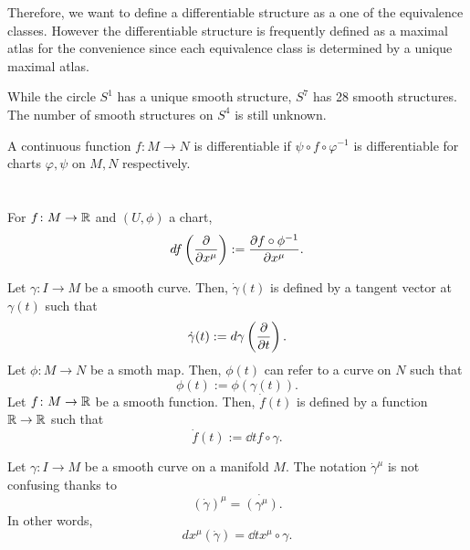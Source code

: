 \documentclass{../crs}
\begin{document}
Therefore, we want to define a differentiable structure as a one of the equivalence classes.
However the differentiable structure is frequently defined as a maximal atlas for the convenience since each equivalence class is determined by a unique maximal atlas.


\begin{ex}
While the circle $S^1$ has a unique smooth structure, $S^7$ has 28 smooth structures.
The number of smooth structures on $S^4$ is still unknown.
\end{ex}

\begin{defn}
A continuous function $f\colon M\to N$ is differentiable if $\psi\circ f\circ\varphi^{-1}$ is differentiable for charts $\varphi,\psi$ on $M,N$ respectively.
\end{defn}




\begin{defn}
\end{defn}





\section{}

\begin{defn}
For $f\colon M\to\R$ and $(U,\phi)$ a chart,
\[df\left(\pd{x^\mu}\right):=\pd{f\circ\phi^{-1}}{x^\mu}.\]
\end{defn}



\begin{defn}
Let $\gamma\colon I\to M$ be a smooth curve.
Then, $\dot\gamma(t)$ is defined by a tangent vector at $\gamma(t)$ such that
\[\dot\gamma(t):=d\gamma\left(\pd{t}\right).\]
Let $\phi\colon M\to N$ be a smoth map.
Then, $\phi(t)$ can refer to a curve on $N$ such that
\[\phi(t):=\phi(\gamma(t)).\]
Let $f\colon M\to\R$ be a smooth function.
Then, $\dot f(t)$ is defined by a function $\R\to\R$ such that
\[\dot f(t):=\dd{t}f\circ\gamma.\]
\end{defn}

\begin{prop}
Let $\gamma\colon I\to M$ be a smooth curve on a manifold $M$.
The notation $\dot\gamma^\mu$ is not confusing thanks to
\[(\dot\gamma)^\mu=\dot{(\gamma^\mu)}.\]
In other words,
\[dx^\mu(\dot\gamma)=\dd{t}x^\mu\circ\gamma.\]
\end{prop}
\end{document}
